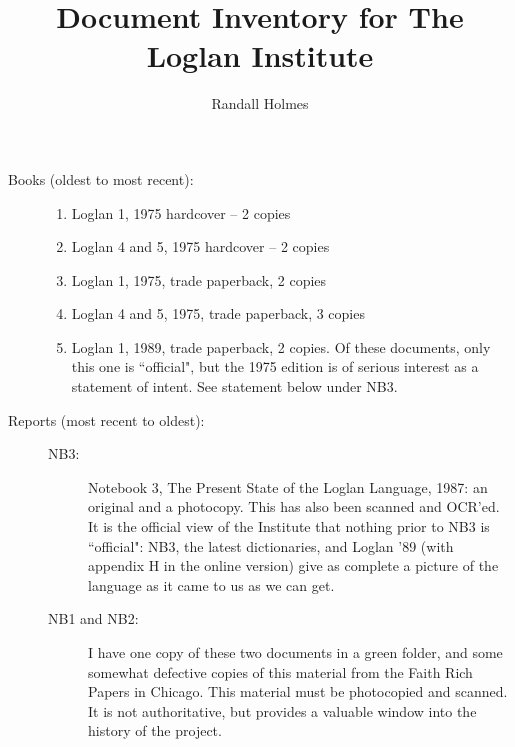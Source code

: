\documentclass[12pt]{article}
\title{Document Inventory for The Loglan Institute}
\author{Randall Holmes}
\begin{document}
\maketitle

\begin{description}

\item[Books (oldest to most recent):]

\begin{enumerate}

\item  Loglan 1, 1975 hardcover -- 2 copies

\item  Loglan 4 and 5, 1975 hardcover -- 2 copies

\item  Loglan 1, 1975, trade paperback, 2 copies

\item Loglan 4 and 5, 1975, trade paperback, 3 copies

\item  Loglan 1, 1989, trade paperback, 2 copies.  Of these documents, only this one is ``official", but the 1975 edition is of serious interest as a statement of intent.   See statement below under NB3.

\end{enumerate}

\item[Reports (most recent to oldest):]

\begin{description}

\item[NB3:]   Notebook 3, The Present State of the Loglan Language, 1987:  an original and a photocopy.  This has also been scanned and OCR'ed.  It is the official view of the Institute that nothing prior to NB3 is ``official":  NB3, the latest dictionaries, and Loglan '89 (with appendix H in the online version) give as complete a picture of the language as it came to us as we can get.

\item[NB1 and NB2:]  I have one copy of these two documents in a green folder, and some somewhat defective copies of this material from the Faith Rich Papers in Chicago.  This material must be photocopied and scanned.  It is not authoritative, but provides a valuable window into the history of the project.



\begin{enumerate}


\end{enumerate}
\end{description}
\end{description}
\end{document}
